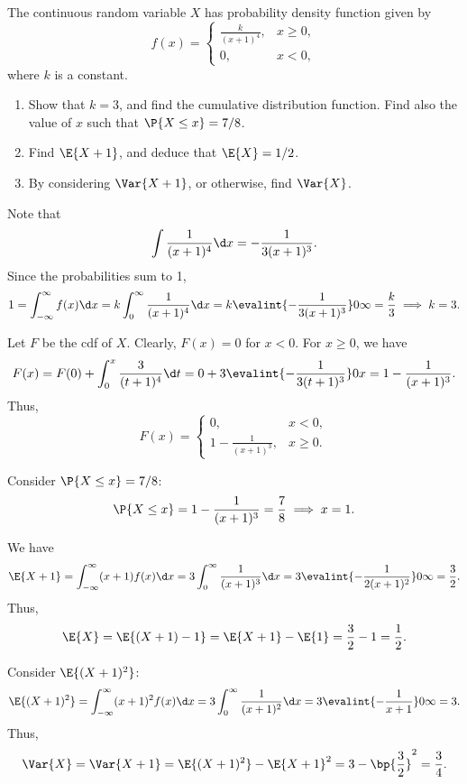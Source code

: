 \begin{problem}
    The continuous random variable $X$ has probability density function given by \[f(x) = \begin{cases}
        \frac{k}{(x+1)^4}, & x \geq 0,\\
        0, & x < 0,
    \end{cases}\] where $k$ is a constant.

    \begin{enumerate}
        \item Show that $k=3$, and find the cumulative distribution function. Find also the value of $x$ such that $\P{X \leq x}= 7/8$.
        \item Find $\E{X + 1}$, and deduce that $\E{X} = 1/2$.
        \item By considering $\Var{X+1}$, or otherwise, find $\Var{X}$.
    \end{enumerate}
\end{problem}
\begin{solution}
    \begin{ppart}
        Note that \[\int \frac1{(x+1)^4} \d x = -\frac1{3 (x+1)^3}.\] Since the probabilities sum to 1, \[1 = \int_{-\infty}^{\infty} f(x) \d x = k \int_0^\infty \frac{1}{(x+1)^4} \d x = k \evalint{-\frac{1}{3(x+1)^3}}0\infty = \frac{k}3 \implies k = 3.\]

        Let $F$ be the cdf of $X$. Clearly, $F(x) = 0$ for $x < 0$. For $x \geq 0$, we have \[F(x) = F(0) + \int_0^x \frac3{(t+1)^4} \d t = 0 + 3 \evalint{-\frac1{3(t+1)^3}}0x = 1 - \frac{1}{(x+1)^3}.\] Thus, \[F(x) = \begin{cases}
            0, & x < 0,\\
            1 - \frac1{(x+1)^3}, & x \geq 0.
        \end{cases}\]

        Consider $\P{X \leq x} = 7/8$: \[\P{X \leq x} = 1 - \frac1{(x+1)^3} = \frac78 \implies x = 1.\]
    \end{ppart}
    \begin{ppart}
        We have \[\E{X + 1} = \int_{-\infty}^\infty (x+1) f(x) \d x = 3\int_0^\infty \frac{1}{(x+1)^3} \d x = 3\evalint{-\frac1{2(x+1)^2}}0\infty = \frac32.\] Thus, \[\E{X} = \E{(X+1) - 1} = \E{X + 1} - \E{1} = \frac32 - 1 = \frac12.\]
    \end{ppart}
    \begin{ppart}
        Consider $\E{(X+1)^2}$: \[\E{(X+1)^2} = \int_{-\infty}^\infty (x+1)^2 f(x) \d x = 3 \int_0^\infty \frac1{(x+1)^2} \d x = 3\evalint{-\frac1{x+1}}0\infty = 3.\] Thus, \[\Var{X} = \Var{X + 1} = \E{(X+1)^2} - \E{X+1}^2 = 3 - \bp{\frac32}^2 = \frac34.\]
    \end{ppart}
\end{solution}

